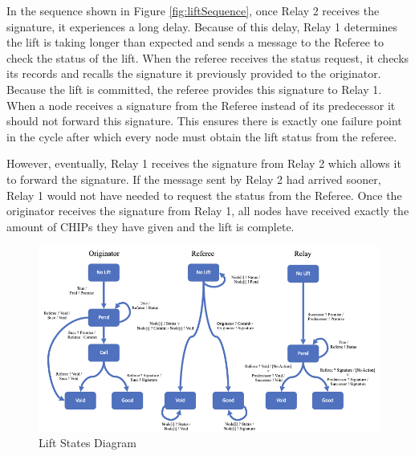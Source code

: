 \documentclass[runningheads]{llncs}
\newcommand{\figref}[1]{Figure \ref{#1}}
\newif\ifcomments
\newif\ifkylecomments
\newcommand{\egm}[1]{\ifcomments\textcolor{orange}{egm: #1}\fi}
\newcommand{\krs}[1]{\ifkylecomments\textcolor{blue}{krs: #1}\fi}
\begin{document}
In the sequence shown in \figref{fig:liftSequence}, once Relay 2 receives the signature, it experiences a long delay. Because of this delay, Relay 1 determines the lift is taking longer than expected and sends a message to the Referee to check the status of the lift. When the referee receives the status request, it checks its records and recalls the signature it previously provided to the originator. Because the lift is committed, the referee provides this signature to Relay 1. When a node receives a signature from the Referee instead of its predecessor it should not forward this signature. This ensures there is exactly one failure point in the cycle after which every node must obtain the lift status from the referee. 
\krs{Removed. This is covered elsewhere \egm{Move the following sentence to its respective section. Leave the protocol general here.}}
However, eventually, Relay 1 receives the signature from Relay 2 which allows it to forward the signature. If the message sent by Relay 2 had arrived sooner, Relay 1 would not have needed to request the status from the Referee. Once the originator receives the signature from Relay 1, all nodes have received exactly the amount of CHIPs they have given and the lift is complete.

\krs{removed and fixed. Much more concise now \egm{The following paragraph read as if it were out of place. We already have introducted the three roles, so the restatement here read strange. Maybe just fix the transition, or move/merge the following introductory text to the earlier introductory text.}}

\begin{figure}
    \centering
    \includegraphics[scale=0.42]{LiftStatesSeperate.png}
    \caption{Lift States Diagram}
    \label{fig:liftStates}
\end{figure}
\end{document}
